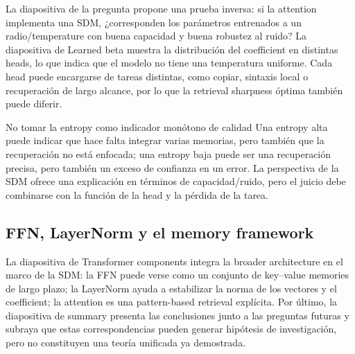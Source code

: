 La diapositiva de la pregunta propone una prueba inversa: si la attention implementa una SDM, ¿corresponden los parámetros entrenados a un radio/temperature con buena capacidad y buena robustez al ruido? La diapositiva de Learned beta muestra la distribución del coefficient en distintas heads, lo que indica que el modelo no tiene una temperatura uniforme. Cada head puede encargarse de tareas distintas, como copiar, sintaxis local o recuperación de largo alcance, por lo que la retrieval sharpness óptima también puede diferir.



\begin{warningbox}{No tomar la entropy como indicador monótono de calidad}
Una entropy alta puede indicar que hace falta integrar varias memorias, pero también que la recuperación no está enfocada; una entropy baja puede ser una recuperación precisa, pero también un exceso de confianza en un error. La perspectiva de la SDM ofrece una explicación en términos de capacidad/ruido, pero el juicio debe combinarse con la función de la head y la pérdida de la tarea.
\end{warningbox}

\subsection{FFN, LayerNorm y el memory framework}

La diapositiva de Transformer components integra la broader architecture en el marco de la SDM: la FFN puede verse como un conjunto de key--value memories de largo plazo; la LayerNorm ayuda a estabilizar la norma de los vectores y el coefficient; la attention es una pattern-based retrieval explícita. Por último, la diapositiva de summary presenta las conclusiones junto a las preguntas futuras y subraya que estas correspondencias pueden generar hipótesis de investigación, pero no constituyen una teoría unificada ya demostrada.


